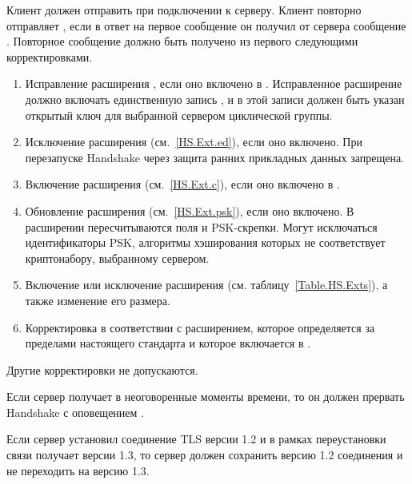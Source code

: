 Клиент должен отправить  при подключении к серверу.
%
Клиент повторно отправляет , если в ответ на первое сообщение 
он получил от сервера сообщение . 
%
Повторное сообщение  должно быть получено из первого 
следующими корректировками.
%        
\begin{enumerate}
\item
Исправление расширения , если оно включено
в . Исправленное расширение должно 
включать единственную запись , и в этой записи должен быть  
указан открытый ключ для выбранной сервером циклической группы.

\item
Исключение расширения  (см.~\ref{HS.Ext.ed}), если 
оно включено. При перезапуске Handshake через 
защита ранних прикладных данных запрещена.

\item
Включение расширения  (см.~\ref{HS.Ext.c}), если оно 
включено в .

\item
Обновление расширения  
(см.~\ref{HS.Ext.psk}), если оно включено. В расширении пересчитываются поля 
 и PSK-скрепки. Могут исключаться идентификаторы 
PSK, алгоритмы хэширования которых не соответствует криптонабору, выбранному 
сервером.

\item
Включение или исключение расширения  
(см. таблицу~\ref{Table.HS.Exts}), а также изменение его размера.

\item
Корректировка в соответствии с расширением, которое определяется за пределами 
настоящего стандарта и которое включается в .
\end{enumerate}

Другие корректировки  не допускаются.

Если сервер получает  в неоговоренные моменты времени, 
то он должен прервать Handshake с оповещением 
.

Если сервер установил соединение TLS версии 1.2 и в рамках переустановки
связи получает  версии 1.3, то сервер должен сохранить 
версию 1.2 соединения и не переходить на версию 1.3.

